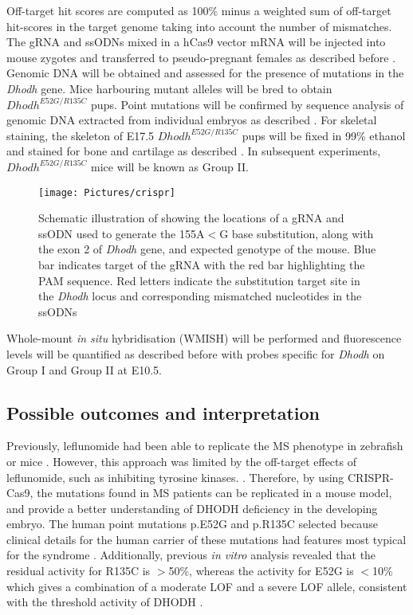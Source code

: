\documentclass[12pt]{article}
\begin{document}
Off-target hit scores are computed as 100\% minus a weighted sum of off-target hit-scores in the target genome taking into account the number of mismatches. 
The gRNA and ssODNs mixed in a hCas9 vector mRNA will be injected into mouse zygotes and transferred to  pseudo-pregnant females as described before \citep{inui2014rapid,  kato2013production, takada2013targeted}. Genomic DNA will be obtained and assessed for the presence of mutations in the \textit{Dhodh} gene. Mice harbouring mutant alleles will be bred to obtain $Dhodh^{E52G/R135C}$ pups. Point mutations will be confirmed by sequence analysis of genomic DNA extracted from individual embryos as described \citep{inui2014rapid}. For skeletal staining, the skeleton of E17.5 $Dhodh^{E52G/R135C}$ pups will be fixed in 99\% ethanol and stained for bone and cartilage as described \citep{baek2014skeletal}. In subsequent experiments, $Dhodh^{E52G/R135C}$ mice will be known as Group II. 
 \begin{figure}[!htp]
 	\centering
 	\texttt{[image: Pictures/crispr]}
 	\caption{Schematic illustration of showing the locations of a gRNA and ssODN used to generate the 155A$<$G base substitution, along with the exon 2 of \textit{Dhodh} gene, and expected genotype of the mouse. Blue bar indicates target of the gRNA with the red bar highlighting the PAM sequence. Red letters indicate the substitution target site in the \textit{Dhodh} locus and corresponding mismatched nucleotides in the ssODNs }
 	\label{fig:crispr}
 \end{figure}
 
Whole-mount \textit{in situ} hybridisation (WMISH) will be performed and fluorescence levels will be quantified as described before \citep{doi:10.1093/hmg/dds218} with probes specific for \textit{Dhodh} on Group I and Group II at E10.5. 


\subsection{Possible outcomes and interpretation}
Previously, leflunomide had been able to replicate the MS phenotype in zebrafish or mice \citep{white2011dhodh, fukushima2009inhibiting}. However, this approach was limited by the off-target effects of leflunomide, such as inhibiting tyrosine kinases.  \citep{fukushima2009inhibiting}. Therefore, by using CRISPR-Cas9, the mutations found in MS patients can be replicated in a mouse model, and provide a better understanding of DHODH deficiency in the developing embryo. 
The human point mutations p.E52G and p.R135C  selected because clinical details for the human carrier of these mutations had features most typical for the syndrome \citep{doi:10.1093/hmg/dds218}. Additionally, previous \textit{in vitro} analysis revealed that the residual activity for R135C is $>$50\%, whereas the activity for E52G is $<$10\% which gives a combination of a moderate LOF and a severe LOF allele, consistent with the threshold activity of DHODH \citep{doi:10.1093/hmg/dds218}. 
\end{document}
